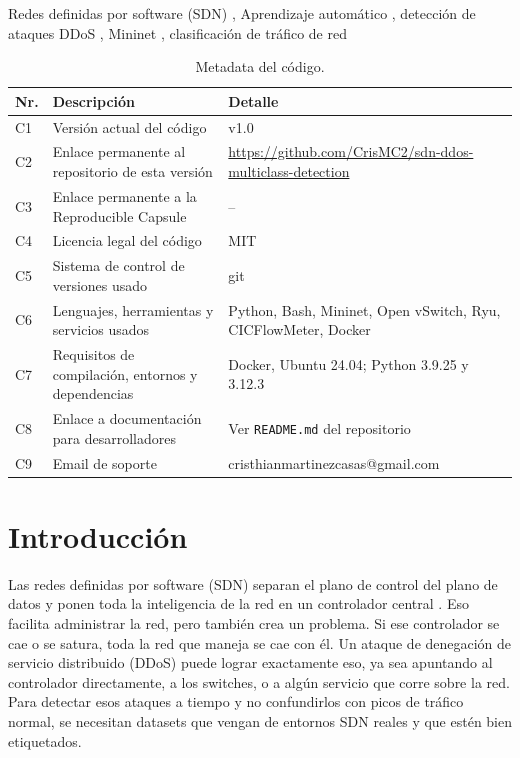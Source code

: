 \documentclass[a4paper,fleqn]{cas-dc}
\begin{document}
\begin{keywords}
Redes definidas por software (SDN) \sep
Aprendizaje automático \sep
detección de ataques DDoS \sep
Mininet \sep
clasificación de tráfico de red
\end{keywords}

\maketitle

\begin{table}[t]
      \small
      \caption{Metadata del código.}\label{tbl:metadata}
      \begin{tabular*}{\textwidth}{@{}p{1cm}p{6.5cm}L@{}}
            \toprule
            Nr. & Descripción & Detalle \\
            \midrule
            C1 & Versión actual del código & v1.0 \\
            C2 & Enlace permanente al repositorio de esta versión & \url{https://github.com/CrisMC2/sdn-ddos-multiclass-detection} \\
            C3 & Enlace permanente a la Reproducible Capsule & -- \\
            C4 & Licencia legal del código & MIT \\
            C5 & Sistema de control de versiones usado & git \\
            C6 & Lenguajes, herramientas y servicios usados & Python, Bash, Mininet, Open vSwitch, Ryu, CICFlowMeter, Docker \\
            C7 & Requisitos de compilación, entornos y dependencias & Docker, Ubuntu 24.04; Python 3.9.25 y 3.12.3 \\
            C8 & Enlace a documentación para desarrolladores & Ver \texttt{README.md} del repositorio \\
            C9 & Email de soporte & cristhianmartinezcasas@gmail.com \\
            \bottomrule
      \end{tabular*}
\end{table}

\section{Introducción}\label{sec:intro}

Las redes definidas por software (SDN) separan el plano de control del plano de datos y ponen toda la inteligencia de la red en un controlador central \citep{kreutz2015sdn}. Eso facilita administrar la red, pero también crea un problema. Si ese controlador se cae o se satura, toda la red que maneja se cae con él. Un ataque de denegación de servicio distribuido (DDoS) puede lograr exactamente eso, ya sea apuntando al controlador directamente, a los switches, o a algún servicio que corre sobre la red. Para detectar esos ataques a tiempo y no confundirlos con picos de tráfico normal, se necesitan datasets que vengan de entornos SDN reales y que estén bien etiquetados.
\end{document}
